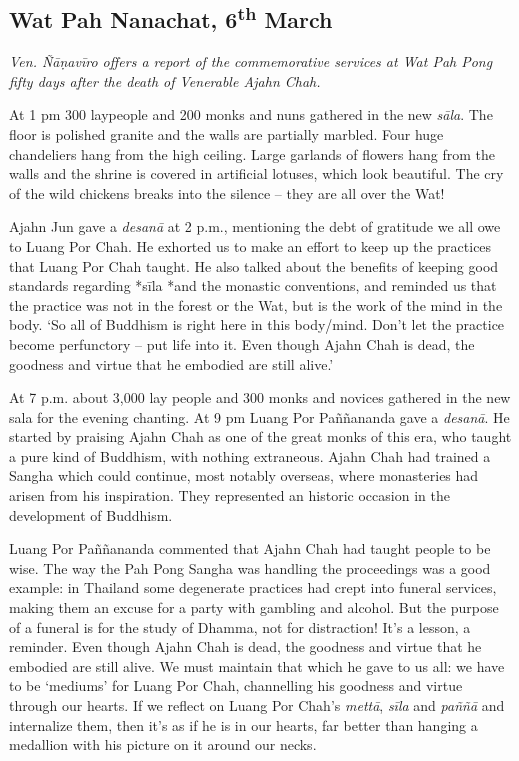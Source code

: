 
\subsection*{Wat Pah Nanachat, 6\textsuperscript{th} March}

\emph{Ven. Ñāṇavīro offers a report of the commemorative services at Wat
Pah Pong fifty days after the death of Venerable Ajahn Chah.}

At 1 pm 300 laypeople and 200 monks and nuns gathered in the new
\emph{sāla}. The floor is polished granite and the walls are partially
marbled. Four huge chandeliers hang from the high ceiling. Large
garlands of flowers hang from the walls and the shrine is covered in
artificial lotuses, which look beautiful. The cry of the wild chickens
breaks into the silence -- they are all over the Wat! 

Ajahn Jun gave a \emph{desanā} at 2 p.m., mentioning the debt of gratitude we
all owe to Luang Por Chah. He exhorted us to make an effort to keep up
the practices that Luang Por Chah taught. He also talked about the
benefits of keeping good standards regarding *sīla *and the monastic
conventions, and reminded us that the practice was not in the forest or
the Wat, but is the work of the mind in the body. `So all of Buddhism is
right here in this body/mind. Don't let the practice become perfunctory
-- put life into it. Even though Ajahn Chah is dead, the goodness and
virtue that he embodied are still alive.'

At 7 p.m. about 3,000 lay people and 300 monks and novices gathered in the
new sala for the evening chanting. At 9 pm Luang Por Paññananda gave a
\emph{desanā}. He started by praising Ajahn Chah as one of the great
monks of this era, who taught a pure kind of Buddhism, with nothing
extraneous. Ajahn Chah had trained a Sangha which could continue, most
notably overseas, where monasteries had arisen from his inspiration. 
They represented an historic occasion in the development of Buddhism. 

Luang Por Paññananda commented that Ajahn Chah had taught people to be
wise. The way the Pah Pong Sangha was handling the proceedings was a
good example: in Thailand some degenerate practices had crept into
funeral services, making them an excuse for a party with gambling and
alcohol. But the purpose of a funeral is for the study of Dhamma, not
for distraction! It's a lesson, a reminder. Even though Ajahn Chah is
dead, the goodness and virtue that he embodied are still alive. We must
maintain that which he gave to us all: we have to be `mediums' for Luang
Por Chah, channelling his goodness and virtue through our hearts. If we
reflect on Luang Por Chah's \emph{mettā}, \emph{sīla} and \emph{paññā}
and internalize them, then it's as if he is in our hearts, far better
than hanging a medallion with his picture on it around our necks. 

